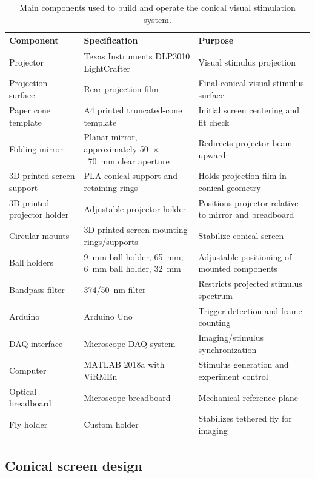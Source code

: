 \begin{table}[h]
\centering
\small
\begin{tabular}{p{4cm} p{6cm} p{5cm}}
\hline
\textbf{Component} & \textbf{Specification} & \textbf{Purpose} \\
\hline
Projector & Texas Instruments DLP3010 LightCrafter & Visual stimulus projection \\
Projection surface & Rear-projection film & Final conical visual stimulus surface \\
Paper cone template & A4 printed truncated-cone template & Initial screen centering and fit check \\
Folding mirror & Planar mirror, approximately 50~$\times$~70~mm clear aperture & Redirects projector beam upward \\
3D-printed screen support & PLA conical support and retaining rings & Holds projection film in conical geometry \\
3D-printed projector holder & Adjustable projector holder & Positions projector relative to mirror and breadboard \\
Circular mounts & 3D-printed screen mounting rings/supports & Stabilize conical screen \\
Ball holders & 9~mm ball holder, 65~mm; 6~mm ball holder, 32~mm & Adjustable positioning of mounted components \\
Bandpass filter & 374/50~nm filter & Restricts projected stimulus spectrum \\
Arduino & Arduino Uno & Trigger detection and frame counting \\
DAQ interface & Microscope DAQ system & Imaging/stimulus synchronization \\
Computer & MATLAB 2018a with ViRMEn & Stimulus generation and experiment control \\
Optical breadboard & Microscope breadboard & Mechanical reference plane \\
Fly holder & Custom holder & Stabilizes tethered fly for imaging \\
\hline
\end{tabular}
\caption{Main components used to build and operate the conical visual stimulation system.}
\label{tab:appendix_components}
\end{table}

\subsection{Conical screen design}

